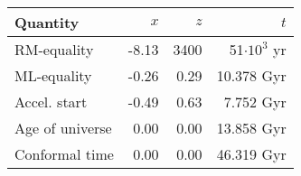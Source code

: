 \begin{tabular}{l|rrr}
Quantity & $x$ & $z$ & $t$  \\
\hline
RM-equality  & -8.13 & 3400 & 51$\cdot 10^3$ yr   \\
ML-equality  & -0.26 & 0.29 & 10.378  Gyr   \\
Accel. start  & -0.49 & 0.63 & 7.752 Gyr    \\
Age of universe  & 0.00 & 0.00 & 13.858 Gyr   \\
Conformal time  & 0.00 & 0.00 & 46.319 Gyr   \\
\hline
\hline
\end{tabular}
